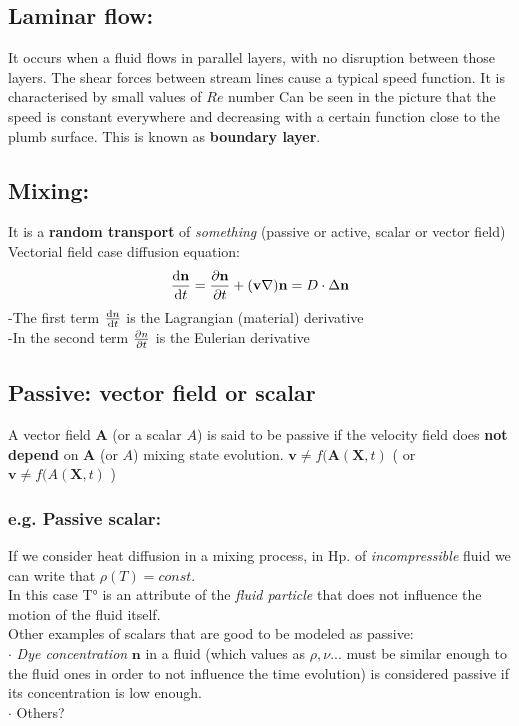 \documentclass[a4paper,11pt]{article}
\begin{document}
\subsection{Laminar flow:}
 It occurs when a fluid flows in parallel layers, with no disruption between those layers.
 The shear forces between stream lines cause a typical speed function. 
 It is characterised by small values of $Re$ number
 Can be seen in the picture that the speed is constant everywhere and decreasing with a certain function close to the plumb surface. 
 This is known as \textbf{boundary layer}.

\subsection{Mixing:}
It is a \textbf{random transport} of \emph{something} (passive or active, scalar or vector field) \\ %
Vectorial field case diffusion equation:
\[ \dv{\mathbf{n}}{t} =\pdv{\mathbf{n}}{t}+(\mathbf{v} \nabla)\mathbf{n} = D \cdot \Delta \mathbf{n} \]
-The first term $\dv{n}{t}$ is the Lagrangian (material) derivative \\
-In the second term $\pdv{n}{t}$ is the Eulerian derivative

 
\subsection{Passive: vector field or scalar}
 A vector field $\mathbf{A}$ (or a scalar $A$) is said to be passive if the velocity field does \textbf{not depend} on $\mathbf{A}$ (or $A$) mixing state evolution.
 $ \mathbf{v} \neq f(\mathbf{A}(\mathbf{X},t) $  ( or $ \mathbf{v} \neq f(A(\mathbf{X},t) $ )
	\subsubsection{e.g. Passive scalar:}
If we consider heat diffusion in a mixing process, in Hp. of \emph{incompressible} fluid we can write that  $ \rho(T)=const. $ \\
In this case T° is an attribute of the \emph{fluid particle} that does not influence the motion of the fluid itself. \\
Other examples of scalars that are good to be modeled as passive: \\
$\cdot$ \emph{Dye concentration} $\mathbf{n}$ in a fluid (which values as $\rho , \nu ...$ must be similar enough to the fluid ones in order to not influence the time evolution) is considered passive if its concentration is low enough. \\
$\cdot$ Others? %
\end{document}
